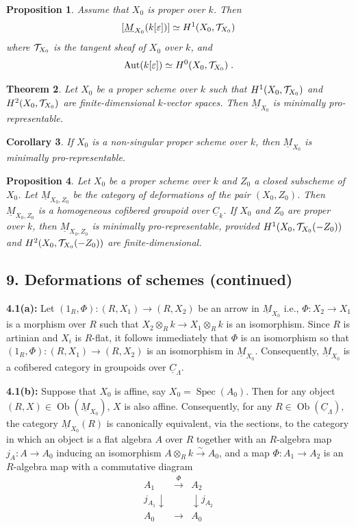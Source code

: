 \documentclass[11pt]{article}
\theoremstyle{plain}
\newtheorem{theorem}{Theorem}[section]
\newtheorem{proposition}[theorem]{Proposition}
\newtheorem{corollary}[theorem]{Corollary}
\theoremstyle{definition}
\theoremstyle{remark}
\DeclareMathOperator{\Spec}{Spec}
\DeclareMathOperator{\Aut}{Aut}
\DeclareMathOperator{\ob}{Ob}
\begin{document}
\begin{proposition}
Assume that $X_0$ is proper over $k$. Then
\[
[\underline{M}_{X_0}(k[\varepsilon])] \simeq H^1(X_0, \mathcal T_{X_0})
\]
where $\mathcal T_{X_0}$ is the tangent sheaf of $X_0$ over $k$, and
\[
\Aut(k[\varepsilon]) \simeq H^0(X_0, \cT_{X_0})\;.
\]
\end{proposition}

\begin{theorem}
Let $X_0$ be a proper scheme over $k$ such that $H^1(X_0, \mathcal T_{X_0})$ and $H^2(X_0, \mathcal T_{X_0})$ are finite-dimensional $k$-vector spaces. Then $\underline{M}_{X_0}$ is minimally pro-representable.
\end{theorem}

\begin{corollary}
If $X_0$ is a non-singular proper scheme over $k$, then $\underline{M}_{X_0}$ is minimally pro-representable.
\end{corollary}

\begin{proposition}
Let $X_0$ be a proper scheme over $k$ and $Z_0$ a closed subscheme of $X_0$. Let $\underline{M}_{X_0, Z_0}$ be the category of deformations of the pair $(X_0, Z_0)$. Then $\underline{M}_{X_0, Z_0}$ is a homogeneous cofibered groupoid over $\underline{C}_k$. If $X_0$ and $Z_0$ are proper over $k$, then $\underline{M}_{X_0, Z_0}$ is minimally pro-representable, provided $H^1(X_0, \mathcal T_{X_0}(-Z_0))$ and $H^2(X_0, \mathcal T_{X_0}(-Z_0))$ are finite-dimensional.
\end{proposition}

\subsection*{9. Deformations of schemes (continued)}

\noindent\textbf{4.1(a):} Let $(1_R,\Phi) : (R, X_1) \to (R, X_2)$ be an arrow in $\underline{M}_{X_0}$ i.e., $\Phi : X_2 \to X_1$ is a morphism over $R$ such that $X_2 \otimes_R k \to X_1 \otimes_R k$ is an isomorphism. Since $R$ is artinian and $X_i$ is $R$-flat, it follows immediately that $\Phi$ is an isomorphism so that $(1_R,\Phi) : (R, X_1) \to (R, X_2)$ is an isomorphism in $\underline{M}_{X_0}$. Consequently, $\underline{M}_{X_0}$ is a cofibered category in groupoids over $\underline{C}_\Lambda$.

\medskip
\noindent\textbf{4.1(b):} Suppose that $X_0$ is affine, say $X_0 = \Spec(A_0)$. Then for any object $(R, X) \in \ob(\underline{M}_{X_0})$, $X$ is also affine. Consequently, for any $R \in \ob(\underline{C}_\Lambda)$, the category $\underline{M}_{X_0}(R)$ is canonically equivalent, via the sections, to the category in which an object is a flat algebra $A$ over $R$ together with an $R$-algebra map $j_A : A \to A_0$ inducing an isomorphism $A \otimes_R k \xrightarrow{\sim} A_0$, and a map $\Phi : A_1 \to A_2$ is an $R$-algebra map with a commutative diagram
\[
\begin{array}{ccc}
A_1 & \xrightarrow{\Phi} & A_2 \\
\scriptstyle{j_{A_1}}\downarrow & & \downarrow\scriptstyle{j_{A_2}} \\
A_0 & \longrightarrow & A_0
\end{array}
\]
\end{document}
